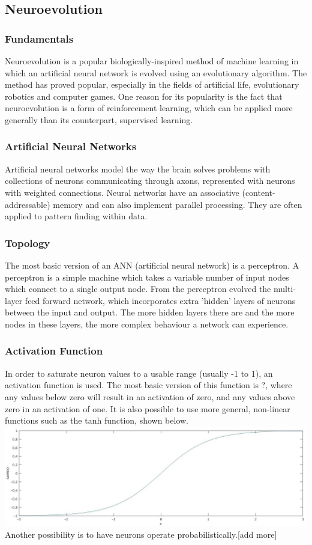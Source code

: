 \documentclass[12pt,a4paper]{article}
\begin{document}
\subsection{Neuroevolution}
\subsubsection{Fundamentals}
Neuroevolution is a popular biologically-inspired method of machine learning in which an artificial neural network is evolved using an evolutionary algorithm. The method has proved popular, especially in the fields of artificial life, evolutionary robotics and computer games. One reason for its popularity is the fact that neuroevolution is a form of reinforcement learning, which can be applied more generally than its counterpart, supervised learning. 

\subsubsection{Artificial Neural Networks}
Artificial neural networks model the way the brain solves problems with collections of neurons communicating through axons, represented with neurons with weighted connections. Neural networks have an associative (content-addressable) memory and can also implement parallel processing. They are often applied to pattern finding within data.

\subsubsection*{Topology}
The most basic version of an ANN (artificial neural network) is a perceptron. A perceptron is a simple machine which takes a variable number of input nodes which connect to a single output node. From the perceptron evolved the multi-layer feed forward network, which incorporates extra 'hidden' layers of neurons between the input and output. The more hidden layers there are and the more nodes in these layers, the more complex behaviour a network can experience. 

\newpage
\subsubsection*{Activation Function}  
In order to saturate neuron values to a usable range (usually -1 to 1), an activation function is used. The most basic version of this function is ?, where any values below zero will result in an activation of zero, and any values above zero in an activation of one. It is also possible to use more general, non-linear functions such as the tanh function, shown below.
\includegraphics[width=\textwidth]{tanh}
Another possibility is to have neurons operate probabilistically.[add more]
\end{document}
